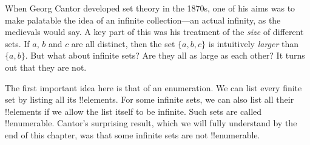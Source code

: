 \documentclass[../../../include/open-logic-section]{subfiles}
\begin{document}


When Georg Cantor developed set theory in the 1870s, one of his aims
was to make palatable the idea of an infinite collection---an actual
infinity, as the medievals would say.  A key part of this was his
treatment of the \emph{size} of different sets. If $a$, $b$ and $c$ are
all distinct, then the set $\{a, b, c\}$ is intuitively \emph{larger}
than $\{a, b\}$. But what about infinite sets? Are they all as large
as each other? It turns out that they are not.

The first important idea here is that of an enumeration.  We can
list every finite set by listing all its !!{element}s.  For some
infinite sets, we can also list all their !!{element}s if we allow the
list itself to be infinite. Such sets are called !!{enumerable}.
Cantor's surprising result, which we will fully understand by the end
of this chapter, was that some infinite sets are not !!{enumerable}.
\end{document}
